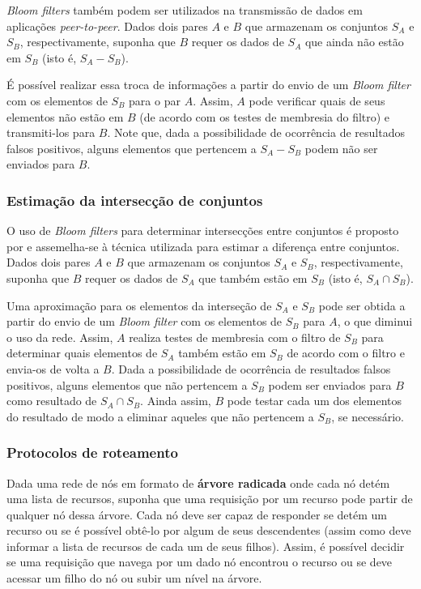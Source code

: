 \documentclass[12pt,twoside,english,brazilian]{article}
\begin{document}
\textit{Bloom filters} também podem ser utilizados na transmissão de dados em aplicações \textit{peer-to-peer}. Dados dois pares $A$ e $B$ que armazenam os conjuntos $S_A$ e $S_B$, respectivamente, suponha que $B$ requer os dados de $S_A$ que ainda não estão em $S_B$ (isto é, $S_A - S_B$).

É possível realizar essa troca de informações a partir do envio de um \textit{Bloom filter} com os elementos de $S_B$ para o par $A$. Assim, $A$ pode verificar quais de seus elementos não estão em $B$ (de acordo com os testes de membresia do filtro) e transmiti-los para $B$. Note que, dada a possibilidade de ocorrência de resultados falsos positivos, alguns elementos que pertencem a $S_A - S_B$ podem não ser enviados para $B$.

\subsubsection{Estimação da intersecção de conjuntos}

O uso de \textit{Bloom filters} para determinar intersecções entre conjuntos é proposto por \citet{vahdat} e assemelha-se à técnica utilizada para estimar a diferença entre conjuntos. Dados dois pares $A$ e $B$ que armazenam os conjuntos $S_A$ e $S_B$, respectivamente, suponha que $B$ requer os dados de $S_A$ que também estão em $S_B$ (isto é, $S_A \cap S_B$).

Uma aproximação para os elementos da interseção de $S_A$ e $S_B$ pode ser obtida a partir do envio de um \textit{Bloom filter} com os elementos de $S_B$ para $A$, o que diminui o uso da rede. Assim, $A$ realiza testes de membresia com o filtro de $S_B$ para determinar quais elementos de $S_A$ também estão em $S_B$ de acordo com o filtro e envia-os de volta a $B$. Dada a possibilidade de ocorrência de resultados falsos positivos, alguns elementos que não pertencem a $S_B$ podem ser enviados para $B$ como resultado de $S_A \cap S_B$. Ainda assim, $B$ pode testar cada um dos elementos do resultado de modo a eliminar aqueles que não pertencem a $S_B$, se necessário.

\subsubsection{Protocolos de roteamento}

Dada uma rede de nós em formato de \textbf{árvore radicada} onde cada nó detém uma lista de recursos, suponha que uma requisição por um recurso pode partir de qualquer nó dessa árvore. Cada nó deve ser capaz de responder se detém um recurso ou se é possível obtê-lo por algum de seus descendentes (assim como deve informar a lista de recursos de cada um de seus filhos). Assim, é possível decidir se uma requisição que navega por um dado nó encontrou o recurso ou se deve acessar um filho do nó ou subir um nível na árvore.
\end{document}
